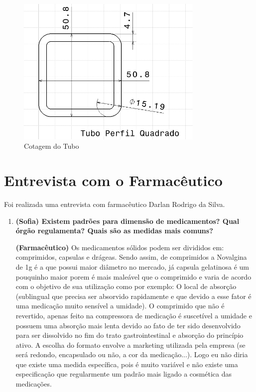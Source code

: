\begin{apendicesenv}
\begin{figure}[H]
    \centering
    \includegraphics[width=0.8\textwidth]{figuras/estrutura/Perfil Quadrado.png}
    \caption{Cotagem do Tubo}
    \label{fig:Cotastubo}
\end{figure}    

\chapter{Entrevista com o Farmacêutico}\label{entrevista_app}

Foi realizada uma entrevista com farmacêutico Darlan Rodrigo da Silva.

\begin{enumerate}
\item \textbf{(Sofia) Existem padrões para dimensão de medicamentos? Qual órgão regulamenta? Quais são as medidas mais comuns?}

\textbf{(Farmacêutico)} Os medicamentos sólidos podem ser divididos em: comprimidos, capsulas e drágeas. Sendo assim, de comprimidos a Novalgina de 1g é a que possui maior diâmetro no mercado, já capsula gelatinosa é um pouquinho maior porem é mais maleável que o comprimido e varia de acordo com o objetivo de sua utilização como por exemplo: O local de absorção (sublingual que precisa ser absorvido rapidamente e que devido a esse fator é uma medicação muito sensível a umidade). O comprimido que não é revertido, apenas feito na compressora de medicação é suscetível a umidade e possuem uma absorção mais lenta devido ao fato de ter sido desenvolvido para ser dissolvido no fim do trato gastrointestinal e absorção do princípio ativo. A escolha do formato envolve a marketing utilizada pela empresa (se será redondo, encapsulado ou não, a cor da medicação...). Logo eu não diria que existe uma medida específica, pois é muito variável e não existe uma especificação que regularmente um padrão mais ligado a cosmética das medicações.


\end{enumerate}
\end{apendicesenv}
